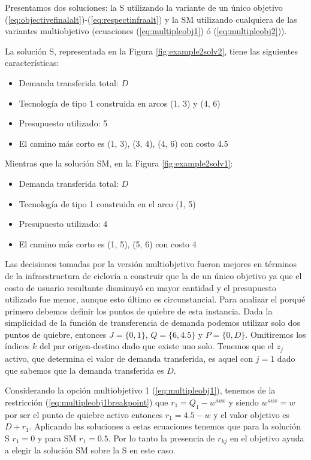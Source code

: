 Presentamos dos soluciones: la S utilizando la variante de un único objetivo (\ref{eq:objectivefinalalt})-(\ref{eq:respectinfraalt}) y la SM utilizando cualquiera de las variantes multiobjetivo (ecuaciones (\ref{eq:multipleobj1}) ó (\ref{eq:multipleobj2})).

La solución S, representada en la Figura \ref{fig:example2solv2}, tiene las siguientes características:

\begin{itemize}
  \item{Demanda transferida total: $D$}
  \item{Tecnología de tipo 1 construida en arcos (1, 3) y (4, 6)}
  \item{Presupuesto utilizado: 5}
  \item{El camino más corto es (1, 3), (3, 4), (4, 6) con costo 4.5}
\end{itemize}

Mientras que la solución SM, en la Figura \ref{fig:example2solv1}:

\begin{itemize}
  \item{Demanda transferida total: $D$}
  \item{Tecnología de tipo 1 construida en el arco (1, 5)}
  \item{Presupuesto utilizado: 4}
  \item{El camino más corto es (1, 5), (5, 6) con costo 4}
\end{itemize}

Las decisiones tomadas por la versión multiobjetivo fueron mejores en términos de la infraestructura de ciclovía a construir que la de un único objetivo ya que el costo de usuario resultante disminuyó en mayor cantidad y el presupuesto utilizado fue menor, aunque esto último es circunstancial. Para analizar el porqué primero debemos definir los puntos de quiebre de esta instancia. Dada la simplicidad de la función de transferencia de demanda podemos utilizar solo dos puntos de quiebre, entonces $J = \{0, 1\}$, $Q = \{6, 4.5\}$ y $P = \{0, D\}$. Omitiremos los índices $k$ del par origen-destino dado que existe uno solo. Tenemos que el $z_j$ activo, que determina el valor de demanda transferida, es aquel con $j = 1$ dado que sabemos que la demanda transferida es $D$.

Considerando la opción multiobjetivo 1 (\ref{eq:multipleobj1}), tenemos de la restricción (\ref{eq:multipleobj1breakpoint}) que $r_1 = Q_1 - w^{aux}$ y siendo $w^{aux} = w$ por ser el punto de quiebre activo entonces $r_1 = 4.5 - w$ y el valor objetivo es $D + r_1$. Aplicando las soluciones a estas ecuaciones tenemos que para la solución S $r_1 = 0$ y para SM $r_1 = 0.5$. Por lo tanto la presencia de $r_{kj}$ en el objetivo ayuda a elegir la solución SM sobre la S en este caso.

